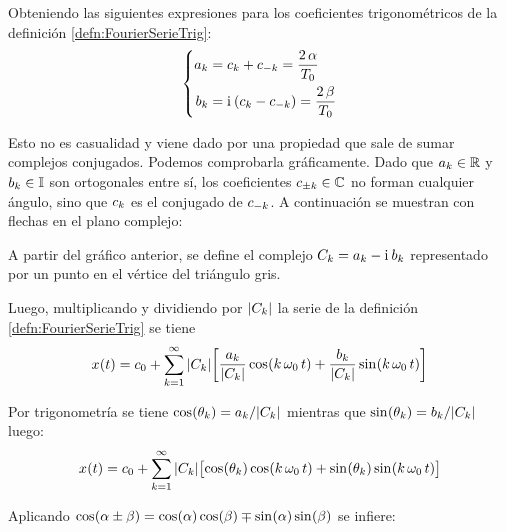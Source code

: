 \documentclass[a5paper,12pt,twoside]{book}
\begin{document}
Obteniendo las siguientes expresiones para los coeficientes trigonométricos de la definición \ref{defn:FourierSerieTrig}:
\begin{equation*}
    \left\{
    \begin{aligned}
        a_\kth &= c_\kth + c_{-\kth} = \frac{2 \, \alpha}{T_0}
        \\
        b_\kth &= \iu \bb{c_\kth - c_{-\kth}} = \frac{2 \, \beta}{T_0}
    \end{aligned}
    \right.
\end{equation*}

Esto no es casualidad y viene dado por una propiedad que sale de sumar complejos conjugados. Podemos comprobarla gráficamente. Dado que $a_\kth \in \setR$ y $b_\kth \in \setI$ son ortogonales entre sí, los coeficientes $c_{\pm\kth} \in \setC$ no forman cualquier ángulo, sino que $c_\kth$ es el conjugado de $c_{-\kth}$. A continuación se muestran con flechas en el plano complejo:

\begin{center}
    \def\svgwidth{0.6\linewidth}
    
\end{center}

A partir del gráfico anterior, se define el complejo $C_\kth = a_\kth - \iu \, b_\kth$ representado por un punto en el vértice del triángulo gris.

Luego, multiplicando y dividiendo por $\norm{C_\kth}$ la serie de la definición \ref{defn:FourierSerieTrig} se tiene
\begin{equation*}
    \fx[x]{t} = c_0 + \sum_{\kth=1}^{\infty} \norm{C_\kth} \sqb{ \dfrac{a_\kth}{\norm{C_\kth}} \fx[\cos]{\kth \, \omega_0 \, t} + \dfrac{b_\kth}{\norm{C_\kth}} \fx[\sin]{\kth \, \omega_0 \, t} }
\end{equation*}

Por trigonometría se tiene $\fx[\cos]{\theta_\kth} = a_\kth / \norm{C_\kth}$ mientras que $\fx[\sin]{\theta_\kth} = b_\kth / \norm{C_\kth}$ luego:
\begin{equation*}
    \fx[x]{t} = c_0 + \sum_{\kth=1}^{\infty} \norm{C_\kth} \sqb{ \fx[\cos]{\theta_\kth} \fx[\cos]{\kth \, \omega_0 \, t} + \fx[\sin]{\theta_\kth} \fx[\sin]{\kth \, \omega_0 \, t} }
\end{equation*}

Aplicando $\fx[\cos]{\alpha \pm \beta} = \fx[\cos]{\alpha} \fx[\cos]{\beta} \mp \fx[\sin]{\alpha} \fx[\sin]{\beta}$ se infiere:
\end{document}
